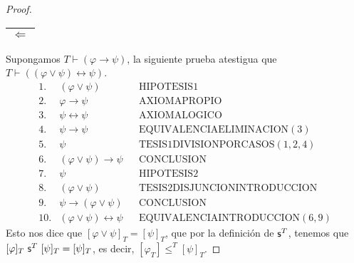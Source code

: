 \begin{proof}
    \PN \begin{tabular}{|c|} \hline $\Leftarrow$ \\\hline \end{tabular} Supongamos $T \vdash (\varphi \rightarrow \psi)$,
    la siguiente prueba atestigua que $T \vdash ((\varphi \vee \psi) \leftrightarrow \psi)$.
    \[
      \begin{array}{llll}
        1. & (\varphi \vee \psi) && \text{HIPOTESIS1} \\
        2. & \varphi \rightarrow \psi && \text{AXIOMAPROPIO} \\
        3. & \psi \leftrightarrow \psi && \text{AXIOMALOGICO} \\
        4. & \psi \rightarrow \psi && \text{EQUIVALENCIAELIMINACION}(3) \\
        5. & \psi && \text{TESIS1DIVISIONPORCASOS}(1,2,4) \\
        6. & (\varphi \vee \psi) \rightarrow \psi && \text{CONCLUSION} \\
        7. & \psi && \text{HIPOTESIS2} \\
        8. & (\varphi \vee \psi) && \text{TESIS2DISJUNCIONINTRODUCCION} \\
        9. & \psi \rightarrow (\varphi \vee \psi) && \text{CONCLUSION} \\
        10. & (\varphi \vee \psi) \leftrightarrow \psi && \text{EQUIVALENCIAINTRODUCCION}(6,9)
      \end{array}
    \]
    \PN Esto nos dice que $[\varphi \vee \psi]_{T} = [\psi]_{T}$, que por la definición de $\mathsf{s}^{T}$, tenemos que
    $[\varphi]_{T} \ \SU^{T} \ [\psi]_{T} = [\psi]_{T}$, es decir, $[\varphi_{T}] \leq^{T} [\psi]_{T}$.
  \end{proof}

